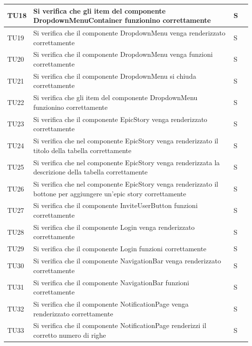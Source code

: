 \documentclass{article}
\begin{document}
\begin{center}
\begin{tabular}{P{5em} P{21em} P{6em} P{6em}}
    \hline
    \end{tabular}
        \end{center}
        
    \begin{center}
    \begin{tabular}{P{5em} P{21em} P{6em} P{6em}}
    TU18 &  Si verifica che gli item del componente DropdownMenuContainer funzionino correttamente  & S\\
    \hline{}
     TU19 &  Si verifica che il componente DropdownMenu venga renderizzato correttamente   & S\\
    \hline
    TU20 & Si verifica che il componente DropdownMenu venga funzioni correttamente &S \\
    \hline{}
    TU21 &  Si verifica che il componente DropdownMenu si chiuda correttamente   &S \\
    \hline{}
     TU22 & Si verifica che gli item del componente DropdownMenu funzionino correttamente  & S\\
    \hline
    TU23 & Si verifica che il componente EpicStory venga renderizzato correttamente & S\\
    
     \hline{}
     TU24 & Si verifica che nel componente EpicStory venga renderizzato il titolo della tabella correttamente    &S \\
    \hline
    
    TU25 & Si verifica che nel componente EpicStory venga renderizzata la descrizione della tabella correttamente   &S \\
    \hline{}
     TU26 & Si verifica che nel componente EpicStory venga renderizzato il bottone per aggiungere un'epic story correttamente   &S \\
    \hline
    TU27 &  Si verifica che il componente InviteUserButton funzioni correttamente & S  \\
    \hline{}
     TU28 & Si verifica che il componente Login venga renderizzato correttamente    &S \\
    \hline
    TU29&Si verifica che il componente Login funzioni correttamente   &S \\
    \hline{}
     TU30 & Si verifica che il componente NavigationBar venga renderizzato correttamente     &S \\
    \hline
    TU31&Si verifica che il componente NavigationBar funzioni correttamente   &S \\
    \hline{}
     TU32 &  Si verifica che il componente NotificationPage venga renderizzato correttamente    &S \\
    \hline
    TU33& Si verifica che il componente NotificationPage renderizzi il corretto numero di righe   & S\\
    

\end{tabular}
\end{center}
\end{document}
